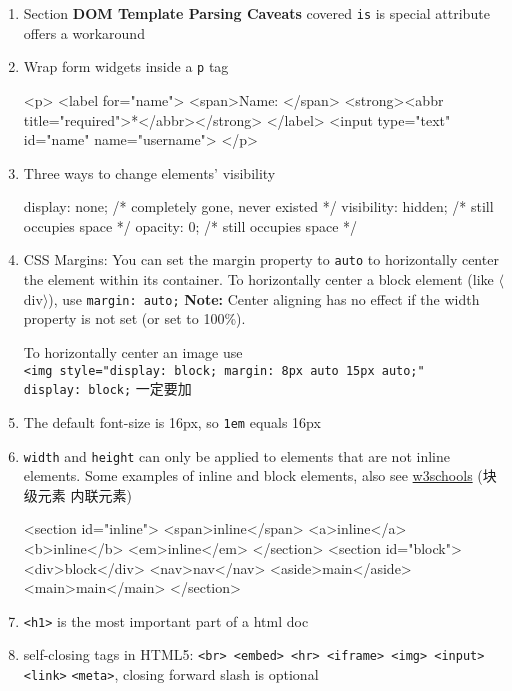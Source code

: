 \documentclass[a4paper,12pt]{article}
\begin{document}
\begin{enumerate}
\item Section \textbf{DOM Template Parsing Caveats} covered \verb|is| is special attribute offers a workaround

\item Wrap form widgets inside a \verb|p| tag
\begin{htmlcode}
<p>
  <label for="name">
    <span>Name: </span>
    <strong><abbr title="required">*</abbr></strong>
  </label>
  <input type="text" id="name" name="username">
</p>
\end{htmlcode}

\item Three ways to change elements' visibility
\begin{htmlcode}
display: none; /* completely gone, never existed */
visibility: hidden; /* still occupies space */
opacity: 0; /* still occupies space */
\end{htmlcode}

\item CSS Margins: You can set the margin property to \verb|auto| to horizontally center the element within its container. To horizontally center a block element (like $\langle$div$\rangle$), use \verb|margin: auto;| \textbf{Note:} Center aligning has no effect if the width property is not set (or set to 100\%).

To horizontally center an image use\\ \verb|<img style="display: block; margin: 8px auto 15px auto;"|\\
\verb|display: block;| 一定要加

\item The default font-size is 16px, so \verb|1em| equals 16px

\item \verb|width| and \verb|height| can only be applied to elements that are not inline elements. Some examples of inline and block elements, also see \href{https://www.w3schools.com/html/html_blocks.asp}{w3schools} (块级元素 内联元素)
\begin{htmlcode}
<section id="inline">
  <span>inline</span>
  <a>inline</a>
  <b>inline</b>
  <em>inline</em>
</section>
<section id="block">
  <div>block</div>
  <nav>nav</nav>
  <aside>main</aside>
  <main>main</main>
</section>
\end{htmlcode}

\item \verb|<h1>| is the most important part of a html doc

\item self-closing tags in HTML5: \verb|<br> <embed> <hr> <iframe> <img> <input> <link>| \verb|<meta>|, closing forward slash is optional


\end{enumerate}
\end{document}

